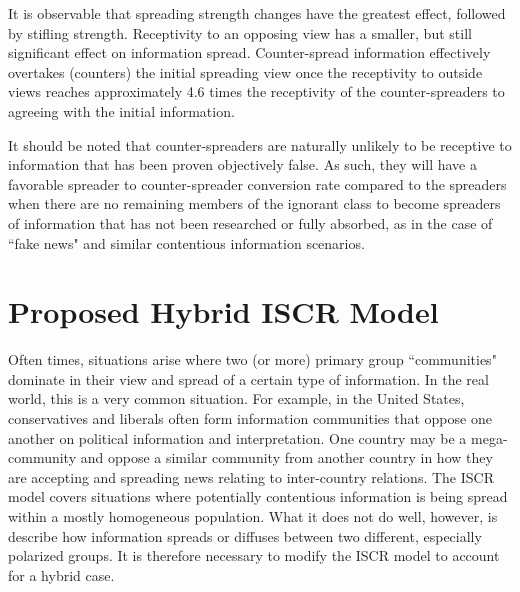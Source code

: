 It is observable that spreading strength changes have the greatest effect, followed by stifling strength. Receptivity to an opposing view has a smaller, but still significant effect on information spread. Counter-spread information effectively overtakes (counters) the initial spreading view once the receptivity to outside views reaches approximately 4.6 times the receptivity of the counter-spreaders to agreeing with the initial information. 

It should be noted that counter-spreaders are naturally unlikely to be receptive to information that has been proven objectively false. As such, they will have a favorable spreader to counter-spreader conversion rate compared to the spreaders when there are no remaining members of the ignorant class to become spreaders of information that has not been researched or fully absorbed, as in the case of ``fake news" and similar contentious information scenarios.

\section{Proposed Hybrid ISCR Model} %
Often times, situations arise where two (or more) primary group ``communities" dominate in their view and spread of a certain type of information. In the real world, this is a very common situation. For example, in the United States, conservatives and liberals often form information communities that oppose one another on political information and interpretation. One country may be a mega-community and oppose a similar community from another country in how they are accepting and spreading news relating to inter-country relations. The ISCR model covers situations where potentially contentious information is being spread within a mostly homogeneous population. What it does not do well, however, is describe how information spreads or diffuses between two different, especially polarized groups. It is therefore necessary to modify the ISCR model to account for a hybrid case.

